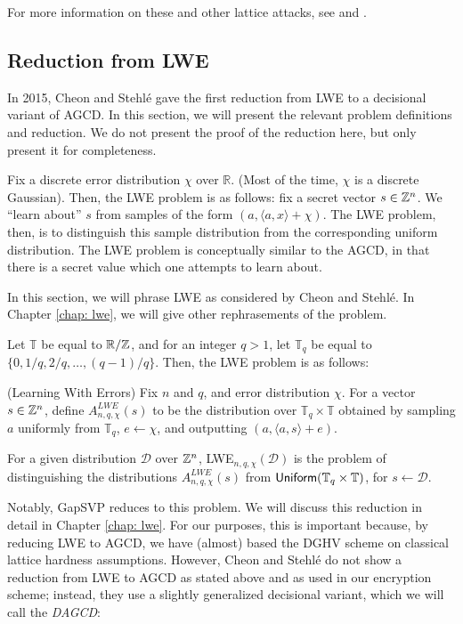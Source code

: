         For more information on these and other lattice attacks, see \cite{dghv} and \cite{galbraithalgorithms}.

    \subsection{Reduction from LWE}

        In 2015, Cheon and Stehl\'e gave the first reduction from LWE to a decisional variant of AGCD. \cite{Cheon2015} In this section, we will present the relevant problem definitions and reduction. We do not present the proof of the reduction here, but only present it for completeness.

        Fix a discrete error distribution $\chi$ over $\mathbb{R}$. (Most of the time, $\chi$ is a discrete Gaussian). Then, the LWE problem is as follows: fix a secret vector $s \in \mathbb{Z}^n$. We ``learn about'' $s$ from samples of the form $(a, \langle a, x \rangle + \chi)$. The LWE problem, then, is to distinguish this sample distribution from the corresponding uniform distribution. The LWE problem is conceptually similar to the AGCD, in that there is a secret value which one attempts to learn about.

        In this section, we will phrase LWE as considered by Cheon and Stehl\'e. In Chapter \ref{chap: lwe}, we will give other rephrasements of the problem.

        Let $\mathbb{T}$ be equal to $\mathbb{R} / \mathbb{Z}$, and for an integer $q > 1$, let $\mathbb{T}_q$ be equal to $\{0, 1/q, 2/q, \dots, (q-1) / q\}$. Then, the LWE problem is as follows:

        \begin{definition} (Learning With Errors)
            Fix $n$ and $q$, and error distribution $\chi$. For a vector $s \in \mathbb{Z}^n$, define $A^{LWE}_{n, q, \chi}(s)$ to be the distribution over $\mathbb{T}_q \times \mathbb{T}$ obtained by sampling $a$ uniformly from $\mathbb{T}_q$, $e \leftarrow \chi$, and outputting $(a, \langle a, s \rangle + e)$.

            For a given distribution $\mathcal{D}$ over $\mathbb{Z}^n$, LWE$_{n, q, \chi}(\mathcal{D})$ is the problem of distinguishing the distributions $A^{LWE}_{n, q, \chi}(s)$ from ${\sf Uniform}(\mathbb{T}_q \times \mathbb{T})$, for $s \leftarrow \mathcal{D}$.
        \end{definition}

        Notably, GapSVP reduces to this problem. \cite{regev2005} We will discuss this reduction in detail in Chapter \ref{chap: lwe}. For our purposes, this is important because, by reducing LWE to AGCD, we have (almost) based the DGHV scheme on classical lattice hardness assumptions. However, Cheon and Stehl\'e do not show a reduction from LWE to AGCD as stated above and as used in our encryption scheme; instead, they use a slightly generalized decisional variant, which we will call the \emph{DAGCD}:


